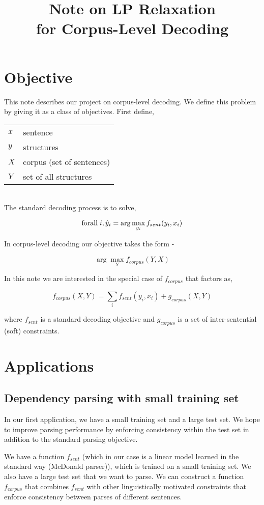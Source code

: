 \documentclass{article}
\title{Note on LP Relaxation \\ for Corpus-Level Decoding}
\begin{document}
\maketitle{}
\section{Objective}

This note describes our project on corpus-level decoding. We define
this problem by giving it as a class of objectives. First define,


\begin{tabular}{l|l}
$x$ & sentence \\
$y$ & structures \\
$X$ & corpus (set of sentences) \\
$Y$ & set of all structures \\
\end{tabular}\\


The standard decoding process is to solve, 

$$\hbox{forall}\; i, \hat{y}_i = \arg\max_{y_i} f_{sent}(y_i, x_i) $$

In corpus-level decoding our objective takes the form -

$$\arg\max_{Y} f_{corpus}(Y, X)$$

In this note we are interested in the special case of $f_{corpus}$ that
factors as,

$$f_{corpus}(X, Y) = \sum_i f_{sent}(y_i, x_i) + g_{corpus}(X, Y)$$

where $f_{sent}$ is a standard decoding objective and $g_{corpus}$ is
a set of inter-sentential (soft) constraints. 


\section{Applications}

\subsection{Dependency parsing with small training set}

In our first application, we have a small training set and a large test
set. We hope to improve parsing performance by enforcing consistency
within the test set in addition to the standard parsing objective. 

We have a function $f_{sent}$ (which in our case is a linear model learned in the standard
way (McDonald parser)), which is trained on a small training
set. We also have a large test set that we want to parse. We can
construct a function $f_{corpus}$ that combines $f_{sent}$ with other
linguistically motivated constraints that enforce consistency between
parses of different sentences. 
\end{document}
